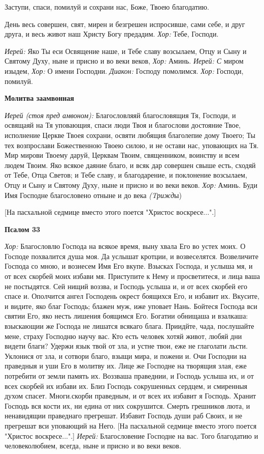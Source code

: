   Заступи, спаси, помилуй и сохрани нас, Боже, Твоею благодатию. 

  День весь совершен, свят, мирен и безгрешен испросивше, сами себе, и друг друга, и весь живот наш Христу Богу предадим. 
{\itshape 
  Хор:} Тебе, Господи. 

{\itshape Иерей:} Яко Ты еси Освящение наше, и Тебе славу возсылаем, Отцу и Сыну и Святому Духу, ныне и присно и во веки веков, {\itshape  Хор:} Аминь. {\itshape  Иерей: С} миром изыдем, 
{\itshape 
  Хор:} О имени Господни. 
{\itshape 
  Диакон:} Господу помолимся. {\itshape  Хор:} Господи, помилуй. 

 {\bfseries Молитва заамвонная }

{\itshape   Иерей (стоя пред амвоном):} Благословляяй благословящия Тя, Господи, и освящаяй на Тя уповающия, спаси люди Твоя и благослови достояние Твое, исполнение Церкве Твоея сохрани, освяти любящия благолепие дому Твоего; Ты тех возпрослави Божественною Твоею силою, и не остави нас, уповающих на Тя. Мир мирови Твоему даруй, Церквам Твоим, священником, воинству и всем людем Твоим. Яко всякое даяние благо, и всяк дар совершен свыше есть, сходяй от Тебе, Отца Светов; и Тебе славу, и благодарение, и поклонение возсылаем, Отцу и Сыну и Святому Духу, ныне и присно и во веки веков. 
{\itshape 
  Хор:} Аминь. Буди Имя Господне благословено отныне и до века {\itshape (Tрижд}ы)

  [На пасхальной седмице вместо этого поется "Христос воскресе...".]

{\bfseries  Псалом 33 }

{\bfseries  }{\itshape  Хор:} Благословлю Господа на всякое время, выну хвала Его во устех моих. О Господе похвалится душа моя. Да услышат кротции, и возвеселятся. Возвеличите Господа со мною, и вознесем Имя Его вкупе. Взысках Господа, и услыша мя, и от всех скорбей моих избави мя. Приступите к Нему и просветитеся, и лица ваша не постыдятся. Сей нищий воззва, и Господь услыша и, и от всех скорбей его спасе и. Ополчится ангел Господень окрест боящихся Его, и избавит их. Вкусите, и видите, яко благ Господь; блажен муж, иже уповает Нань. Бойтеся Господа вси святии Его, яко несть лишения боящимся Его. Богатии обнищаша и взалкаша: взыскающии же Господа не лишатся всякаго блага. Приидйте, чада, послушайте мене, страху Господню научу вас. Кто есть человек хотяй живот, любяй дни видети благи? Удержи язык твой от зла, и устне твои, еже не глаголати льсти. Уклонися от зла, и сотвори благо, взыщи мира, и пожени и. Очи Господни на праведныя и уши Его в молитву их. Лице же Господне на творящия злая, еже потребити от земли память их. Воззваша праведнии, и Господь услыша их, и от всех скорбей их избави их. Близ Господь сокрушенных сердцем, и смиренныя духом спасет. Многи.скорби праведным, и от всех их избавит я Господь. Хранит Господь вся кости их, ни едина от них сокрушится. Смерть грешников люта, и ненавидящии праведнаго прегрешат. Избавит Господь души раб Своих, и не прегрешат вси уповающий на Него.
  [На пасхальной седмице вместо этого поется "Христос воскресе...".]
 {\itshape  Иерей:} Благословение Господне на вас. Того благодатию и человеколюбием, всегда, ныне и присно и во веки веков.

